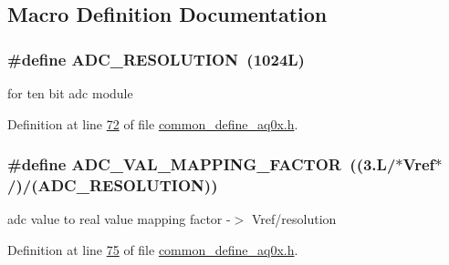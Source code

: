 \subsection{Macro Definition Documentation}
\hypertarget{a00086_a00978ca9e8220475258dcbbbb7d29129}{
\subsubsection[{A\+D\+C\+\_\+\+R\+E\+S\+O\+L\+U\+T\+I\+O\+N}]{\setlength{\rightskip}{0pt plus 5cm}\#define A\+D\+C\+\_\+\+R\+E\+S\+O\+L\+U\+T\+I\+O\+N~(1024\+L)}}\label{a00086_a00978ca9e8220475258dcbbbb7d29129}


for ten bit adc module 



Definition at line \hyperlink{a00086_source_l00072}{72} of file \hyperlink{a00086_source}{common\+\_\+define\+\_\+aq0x.\+h}.

\hypertarget{a00086_ada92d3eeeec0cbeee41e76a52d145792}{
\subsubsection[{A\+D\+C\+\_\+\+V\+A\+L\+\_\+\+M\+A\+P\+P\+I\+N\+G\+\_\+\+F\+A\+C\+T\+O\+R}]{\setlength{\rightskip}{0pt plus 5cm}\#define A\+D\+C\+\_\+\+V\+A\+L\+\_\+\+M\+A\+P\+P\+I\+N\+G\+\_\+\+F\+A\+C\+T\+O\+R~((3.\+L/$\ast$\+Vref$\ast$/)/(\+A\+D\+C\+\_\+\+R\+E\+S\+O\+L\+U\+T\+I\+O\+N))}}\label{a00086_ada92d3eeeec0cbeee41e76a52d145792}


adc value to real value mapping factor -\/$>$ Vref/resolution 



Definition at line \hyperlink{a00086_source_l00075}{75} of file \hyperlink{a00086_source}{common\+\_\+define\+\_\+aq0x.\+h}.



